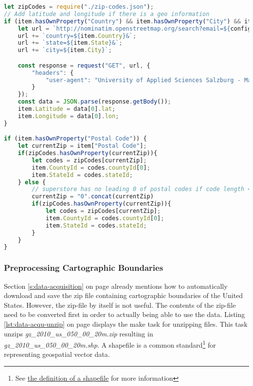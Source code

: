 \begin{lstlisting}[language=JavaScript, caption={Preprocessing Superstore-Sale with latitude and longitude}, label={lst:data-prep-latlong}]
let zipCodes = require("./zip-codes.json");
// Add latitude and longitude if there is a geo information
if (item.hasOwnProperty("Country") && item.hasOwnProperty("City") && item.hasOwnProperty("State")) {
    let url = `http://nominatim.openstreetmap.org/search?email=${config.email}&format=json&`;
    url += `country=${item.Country}&`;
    url += `state=${item.State}&`;
    url += `city=${item.City}`;

    const response = request("GET", url, {
        "headers": {
            "user-agent": "University of Applied Sciences Salzburg - Masterthesis Particles - MMT-M2014"
        }
    });
    const data = JSON.parse(response.getBody());
    item.Latitude = data[0].lat;
    item.Longitude = data[0].lon;
}

if (item.hasOwnProperty("Postal Code")) {
    let currentZip = item["Postal Code"];
    if(zipCodes.hasOwnProperty(currentZip)){
        let codes = zipCodes[currentZip];
        item.CountyId = codes.countyId[0];
        item.StateId = codes.stateId;
    } else {
        // superstore has no leading 0 of postal codes if code length < 5;
        currentZip = "0".concat(currentZip)
        if(zipCodes.hasOwnProperty(currentZip)){
            let codes = zipCodes[currentZip];
            item.CountyId = codes.countyId[0];
            item.StateId = codes.stateId;
        }
    }
}
\end{lstlisting}

\subsubsection{Preprocessing Cartographic Boundaries}
Section \ref{s:data-acquisition} on page \pageref{s:data-acquisition} already mentions how to automatically download and save the zip file containing cartographic boundaries of the United States. However, the zip-file by itself is not useful. The contents of the zip-file need to be converted first in order to actually being able to use the data. Listing \ref{lst:data-acqu-unzip} on page \pageref{lst:data-acqu-unzip} displays the make task for unzipping files. This task unzips \textit{gz\_2010\_us\_050\_00\_20m.zip} resulting in \textit{gz\_2010\_us\_050\_00\_20m.shp}. A shapefile is a common standard\footnote{See \href{https://doc.arcgis.com/en/arcgis-online/reference/shapefiles.htm}{the definition of a shapefile} for more information} for representing geospatial vector data.

